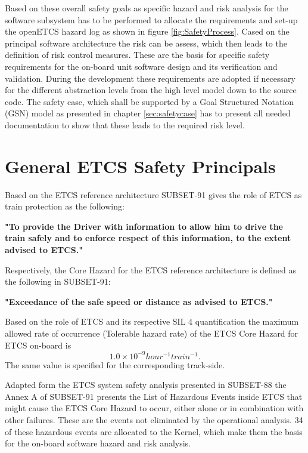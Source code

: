 \documentclass{template/openetcs_report}
\begin{document}
Based on these overall safety goals as specific hazard and risk analysis for the software subsystem has to be performed to allocate the requirements and set-up the openETCS hazard log as shown in figure \ref{fig:SafetyProcess}. Cased on the principal software architecture the risk can be assess, which then leads to the definition of risk control measures. These are the basis for specific safety requirements for the on-board unit software design and its verification and validation. During the development these requirements are adopted if necessary for the different abstraction levels from the high level model down to the source code. The safety case, which shall be supported by a Goal Structured Notation (GSN) \cite{GSNwebsite} model as presented in chapter \ref{sec:safetycase} has to present all needed documentation to show that these leads to the required risk level.

\section{General ETCS Safety Principals}

Based on the ETCS reference architecture SUBSET-91 gives the role of ETCS as train protection as the following:

\begin{center}
\textbf{"To provide the Driver with information to allow  him to drive the train safely and to enforce respect of this information, to the extent advised to ETCS."}
\end{center}

Respectively, the Core Hazard for the ETCS reference architecture is defined as the following in SUBSET-91:
\begin{center}
\textbf{"Exceedance of the safe speed or distance as advised to ETCS."}
\end{center}

Based on the role of ETCS and its respective SIL 4 quantification the maximum allowed rate of occurrence (Tolerable hazard rate) of the ETCS Core Hazard for ETCS on-board is
\[1.0\times10^{-9} hour^{-1} train^{-1}.\]
The same value is specified for the corresponding track-side.

Adapted form the ETCS system safety analysis presented in SUBSET-88 the Annex A of SUBSET-91 presents the List of Hazardous Events inside ETCS that might cause the ETCS Core Hazard to occur, either alone or in combination with other failures. These are the events not eliminated by the operational analysis. 34 of these hazardous events are allocated to the Kernel, which make them the basis for the on-board software hazard and risk analysis. 
\end{document}
